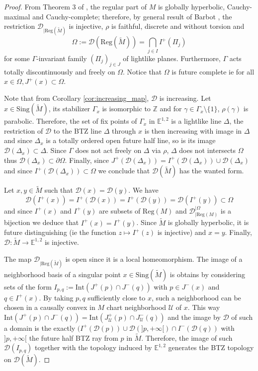 \documentclass[a4paper,12pt]{article}
\def\ZZ{\mathbb{Z}}
\def\D{\mathcal{D}}
\def\U{\mathcal U}
\def\D{\mathcal{D}}
\def\sing{\mathrm{Sing}}
\newcommand{\mass}[1]{{\mathbb E}^{1,2}_{#1}}
\def\Reg{\mathrm{Reg}}
\def\reg{\Reg}
\def\sing{\mathrm{Sing}}
\def\reg{\mathrm{Reg}}
\def\D{\mathcal{D}}
\def\U{\mathcal{U}}
\def\Reg{\mathrm{Reg}}
\def\sing{\mathrm{Sing}}
\begin{document}
\begin{proof}
 From Theorem 3 of \cite{BTZext}, the regular part of $M$ is globally hyperbolic, Cauchy-maximal and Cauchy-complete; therefore, by general result of Barbot \cite{barbot_globally_2004}, the restriction $\D_{|\reg(\widetilde M)}$ is injective, $\rho$ is faithful, discrete and without torsion and $$ \Omega:=\D(\reg(\widetilde M)) =\bigcap_{j\in I} I^+(\Pi_j)$$ for some $\Gamma$-invariant family $(\Pi_j)_{j\in J}$ of lightlike planes. Furthermore, $\Gamma$ acts totally discontinuously and freely on $\Omega$. Notice that $\Omega$ is future complete ie for all $x\in \Omega, J^+(x)\subset \Omega$.
 
 Note that from Corollary \ref{cor:increasing_map}, $\D$ is increasing.  
 Let $x\in \sing(\widetilde M)$, its stabilizer $\Gamma_x$ is isomorphic to $\ZZ$ and for $\gamma\in \Gamma_x\setminus\{1\}$, $\rho(\gamma)$ is parabolic. Therefore, the set of fix points of $\Gamma_x$ in $\mass{}$ is a lightlike line $\Delta$, the restriction of $\D$ to the BTZ line $\Delta$ through $x$ is then increasing  with image in $\Delta$ and since $\Delta_x$ is a totally ordered open future half line, so is its image $\D(\Delta_x)\subset\Delta$.
 Since $\Gamma$ does not act freely on $\Delta$  via $\rho$, $\Delta$ does not intersects $\Omega$ thus $\D(\Delta_x) \subset \partial\Omega$. 
 Finally, since $J^+(\D(\Delta_x)) = I^+(\D(\Delta_x))\cup \D(\Delta_x) $ and since $I^+(\D(\Delta_x))\subset \Omega$ we conclude that $\D(\widetilde M)$ has the wanted form. 
 
 Let $x,y\in \widetilde M$ such that $\D(x)=\D(y)$. We have $$\D(I^+(x))=I^+(\D(x))=I^+(\D(y))=\D(I^+(y))\subset \Omega$$
 and since $I^+(x)$ and $I^+(y)$ are subsets of $\reg(M)$ and $\D_{|\reg(M)}^{|\Omega}$ is a bijection we deduce that $I^+(x)=I^+(y)$. Since $\widetilde M$ is globally hyperbolic, it is future distinguishing (ie the function $ z\mapsto I^+(z)$ is injective) and $x=y$. Finally, $\D:\widetilde M \rightarrow \mass{}$ is injective.
 
 The map $\D_{|\reg(\widetilde M)}$ is open since it is a local homeomorphism. The image of a neighborhood basis of a singular point $x\in \sing(\widetilde M)$ is obtains by considering sets of the form $I_{p,q}:=\mathrm{Int}(J^+(p)\cap J^-(q))$ with $p\in J^-(x)$ and $q\in I^+(x)$. By taking $p,q$ sufficiently close to $x$, such a neighborhood can be chosen in a causally convex in $M$ chart neighborhood $\U$ of $x$.  This way $\mathrm{Int}(J^+(p)\cap J^-(q)) = \mathrm{Int}(J_\U^+(p)\cap J_\U^-(q))$ and the image by $\D$ of such a domain is the exactly $(I^+(\D(p))\cup \D(]p,+\infty[)\cap I^-(\D(q))$ with $]p,+\infty[$ the future half BTZ ray from $p$ in $\widetilde M$. Therefore, the image of such $\D(I_{p,q})$ together with the topology induced by $\mass{}$ generates the BTZ topology on $\D(\widetilde M)$.
 

\end{proof}
\end{document}
